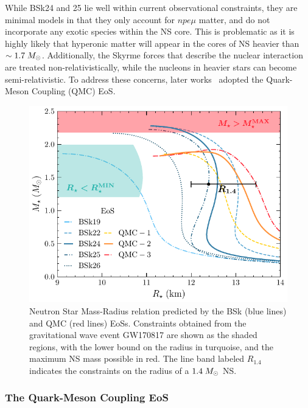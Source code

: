 While BSk24 and 25 lie well within current observational constraints, they are minimal models in that they only account for $npe\mu$ matter, and do not incorporate any exotic species within the NS core. This is problematic as it is highly likely that hyperonic matter will appear in the cores of NS heavier than $\sim 1.7\;M_\odot$.  Additionally, the Skyrme forces that describe the nuclear interaction are treated non-relativistically, while the nucleons in heavier stars can become semi-relativistic. To address these concerns, later works~\cite{Anzuini:2021lnv_nov_Improvedtreatmentdark, Bell:2023ysh_dec_ThermalizationAnnihilationDark} adopted the Quark-Meson Coupling (QMC) EoS.

\begin{figure}[!t]
    \centering
    \includegraphics{NS_mass_radius.pdf}
    \caption{Neutron Star Mass-Radius relation predicted by the BSk (blue lines) and QMC (red lines) EoSs. Constraints obtained from the gravitational wave event GW170817 are shown as the shaded regions, with the lower bound on the radius in turquoise, and the maximum NS mass possible in red. The line band labeled $R_{1.4}$ indicates the constraints on the radius of a $1.4\;M_\odot$ NS.}
    \label{fig:NS_mass_rad}
\end{figure}

\subsubsection*{The Quark-Meson Coupling EoS}

